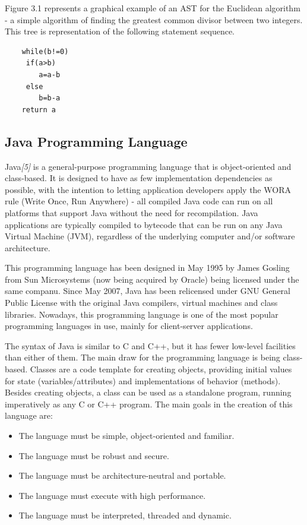 \documentclass[12pt,a4paper,twoside]{report}
\begin{document}
Figure 3.1 represents a graphical example of an AST for the Euclidean algorithm - a simple algorithm of finding the greatest common divisor between two integers. This tree is representation of the following statement sequence.

\begin{lstlisting}
	while(b!=0) 
	 if(a>b)
	 	a=a-b
	 else
	 	b=b-a
	return a
\end{lstlisting}

\subsection{Java Programming Language}
Java{\it[5]}  is a general-purpose programming language that is object-oriented and class-based. It is designed to have as few implementation dependencies as possible, with the intention to letting application developers apply the WORA rule (Write Once, Run Anywhere) - all compiled Java code can run on all platforms that support Java without the need for recompilation. 
Java applications are typically compiled to bytecode that can be run on any Java Virtual Machine (JVM), regardless of the underlying computer and/or software architecture. 

This programming language has been designed in May 1995 by James Gosling from Sun Microsystems (now being acquired by Oracle) being licensed under the same companu. Since May 2007, Java has been relicensed under GNU General Public License with the original Java compilers, virtual machines and class libraries. Nowadays, this programming language is one of the most popular programming languages in use, mainly for client-server applications. 

The syntax of Java is similar to C and C++, but it has fewer low-level facilities than either of them. The main draw for the programming language is being class-based. Classes are a code template for creating objects, providing initial values for state (variables/attributes) and implementations of behavior (methods). Besides creating objects, a class can be used as a standalone program, running imperatively as any C or C++ program. The main goals in the creation of this language are:
\begin{itemize}
 \item The language must be simple, object-oriented and familiar.
 \item The language must be robust and secure.
 \item The language must be architecture-neutral and portable.
 \item The language must execute with high performance.
 \item The language must be interpreted, threaded and dynamic.
\end{itemize}
\end{document}
